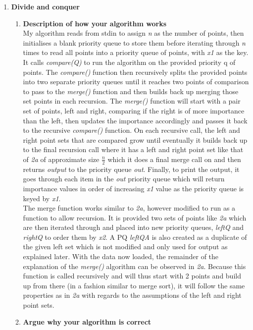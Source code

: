 \documentclass[11pt, oneside]{article}   	%
\begin{document}
\begin{enumerate}
\begin{enumerate}
		\item \textbf{Divide and conquer}
			\begin{enumerate}
				\item \textbf{Description of how your algorithm works}\\
				My algorithm reads from stdin to assign \textit{n} as the number of points, then initialises a blank priority queue to store them before iterating through \textit{n} times to read all points into a priority queue of points, with \textit{x1} as the key. It calls \textit{compare(Q)} to run the algorithm on the provided priority q of points. The \textit{compare()} function then recursively splits the provided points into two separate priority queues until it reaches two points of comparison to pass to the \textit{merge()} function and then builds back up merging those set points in each recursion. The \textit{merge()} function will start with a pair set of points, left and right, comparing if the right is of more importance than the left, then updates the importance accordingly and passes it back to the recursive \textit{compare()} function. On each recursive call, the left and right point sets that are compared grow until eventually it builds back up to the final recursion call where it has a left and right point set like that of \textit{2a} of approximate size $\frac{n}{2}$ which it does a final merge call on and then returns \textit{output} to the priority queue \textit{out}. Finally, to print the output, it goes through each item in the \textit{out} priority queue which will return importance values in order of increasing \textit{x1} value as the priority queue is keyed by \textit{x1}.\\
				The merge function works similar to \textit{2a}, however modified to run as a function to allow recursion. It is provided two sets of points like \textit{2a} which are then iterated through and placed into new priority queues, \textit{leftQ} and \textit{rightQ} to order them by \textit{x2}. A PQ \textit{leftQA} is also created as a duplicate of the given left set which is not modified and only used for output as explained later. With the data now loaded, the remainder of the explanation of the \textit{merge()} algorithm can be observed in \textit{2a}. Because this function is called recursively and will thus start with 2 points and build up from there (in a fashion similar to merge sort), it will follow the same properties as in \textit{2a} with regards to the assumptions of the left and right point sets.
				\item \textbf{Argue why your algorithm is correct}\\

\end{enumerate}
\end{enumerate}
\end{enumerate}
\end{document}
